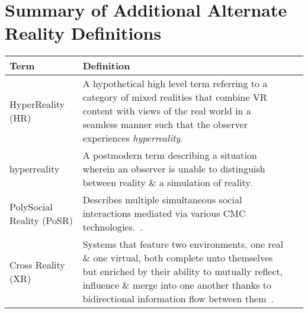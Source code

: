 \section{Summary of Additional Alternate Reality Definitions}
\label{summaryofadditionalalternaterealitydefinitions}

\begin{table}
\begin{center}
\begin{tabularx}{\textwidth}{l *{2}{>{\centering\arraybackslash}X}}

\toprule

\textbf{Term} & \textbf{Definition} \\

\midrule

		
HyperReality (HR) & A hypothetical high level term referring to a category of mixed realities that combine VR content with views of the real world in a seamless manner such that the observer experiences \textit{hyperreality}. \\
		
\midrule
		

hyperreality & A postmodern term describing a situation wherein an observer is unable to distinguish between reality \& a simulation of reality. \\

\midrule

		
PolySocial Reality (PoSR) & Describes multiple simultaneous social interactions mediated via various CMC technologies.~\cite{Applin2012}. \\

\midrule


Cross Reality (XR) & Systems that feature two environments, one real \& one virtual, both complete unto themselves~\cite{lifton:merging} but enriched by their ability to mutually reflect, influence \& merge into one another thanks to bidirectional information flow between them~\cite{kim:practical}. \\


\end{tabularx}
\end{center}
\end{table}
